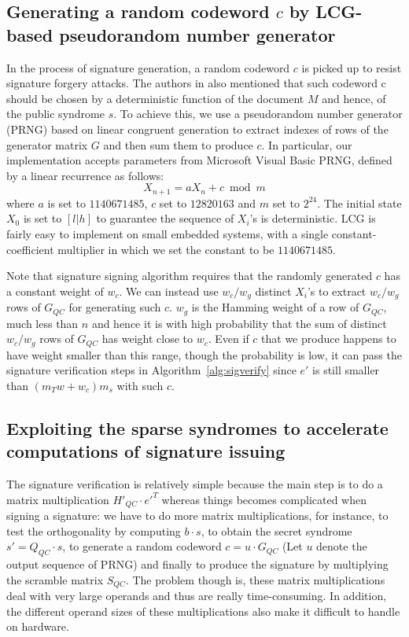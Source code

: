 \documentclass[10pt,journal,compsoc]{IEEEtran}
\begin{document}
\subsection{Generating a random codeword $c$ by LCG-based pseudorandom number generator}
In the process of signature generation, a random codeword $c$ is picked up to resist signature forgery attacks\cite{baldi2013using}.
The authors in \cite{baldi2013using} also mentioned that such codeword c should be chosen by a deterministic function of the document $M$ and hence, of the public syndrome $s$. To achieve this, we use a pseudorandom number generator (PRNG) based on linear congruent generation to extract
indexes of rows of the generator matrix $G$ and then sum them to produce $c$. In particular, our implementation accepts parameters from Microsoft Visual Basic PRNG, defined by a linear recurrence as follows:
\begin{equation}
X_{n+1} = aX_{n}+c \bmod m
\end{equation}
where $a$ is set to $1140671485$, $c$ set to $12820163$ and $m$ set to $2^{24}$. The initial state $X_0$ is set to $[l|h]$ to guarantee the sequence of $X_{i}$'s  is deterministic. LCG is fairly easy to implement on small embedded systems,  with a single constant-coefficient multiplier in which we set the constant to be $1140671485$.

Note that signature signing algorithm requires that the randomly generated $c$ has a constant weight of $w_c$. We can instead use $w_c/w_g$
distinct $X_{i}$'s to extract  $w_c/w_g$ rows of $G_{QC}$ for generating such $c$. $w_g$ is the Hamming weight of a row of $G_{QC}$, much less than $n$ and hence it is with high probability that the sum of distinct $w_c/w_g$ rows of $G_{QC}$ has weight close to $w_c$. Even if $c$ that we produce happens to have weight smaller than this range, though the probability is low, it can pass the signature verification steps in Algorithm~\ref{alg:sigverify} since $e'$ is still smaller than $(m_Tw+w_c)m_s$ with such $c$.


\subsection{Exploiting the sparse syndromes to accelerate computations of signature issuing}
The signature verification is relatively simple because the main step is to do a matrix multiplication $H'_{QC}\cdot e'^T$ whereas things becomes complicated when signing a signature: we have to do more matrix multiplications, for instance, to test the orthogonality by computing $b\cdot s$, to obtain the secret syndrome $s'=Q_{QC}\cdot s$, to generate a random codeword $c =u\cdot G_{QC}$ (Let $u$ denote the output sequence of PRNG) and finally to produce the signature by multiplying the scramble matrix $S_{QC}$.
The problem though is, these matrix multiplications deal with very large operands and thus are really time-consuming. In addition, the different operand sizes of these multiplications also make it difficult to handle on hardware.
\end{document}
